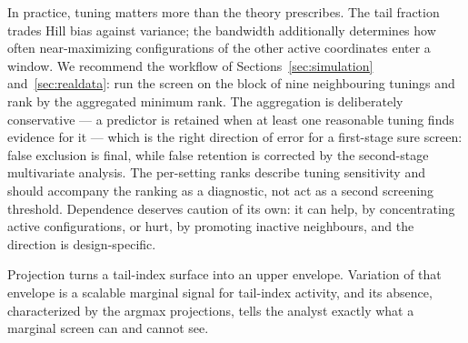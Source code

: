 In practice, tuning matters more than the theory prescribes. The tail
fraction trades Hill bias against variance; the bandwidth additionally
determines how often near-maximizing configurations of the other active
coordinates enter a window. We recommend the workflow of
Sections~\ref{sec:simulation} and~\ref{sec:realdata}: run the screen on
the block of nine neighbouring tunings and rank by the aggregated
minimum rank. The aggregation is deliberately conservative --- a
predictor is retained when at least one reasonable tuning finds
evidence for it --- which is the right direction of error for a
first-stage sure screen: false exclusion is final, while false
retention is corrected by the second-stage multivariate analysis. The
per-setting ranks describe tuning sensitivity and should accompany the
ranking as a diagnostic, not act as a second screening threshold.
Dependence deserves caution of its own: it can help, by concentrating
active configurations, or hurt, by promoting inactive neighbours, and
the direction is design-specific.

Projection turns a tail-index surface into an upper envelope. Variation
of that envelope is a scalable marginal signal for tail-index activity,
and its absence, characterized by the argmax projections, tells the
analyst exactly what a marginal screen can and cannot see.

